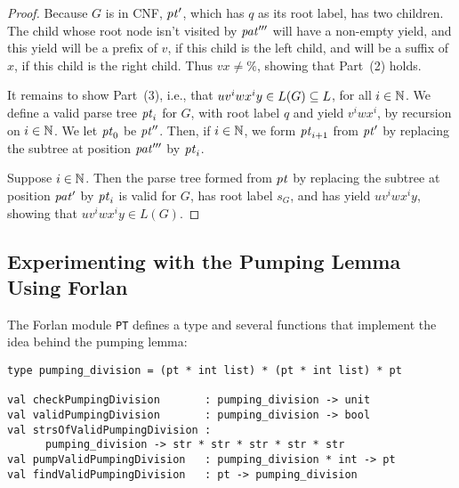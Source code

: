 \begin{proof}
Because $G$ is in CNF, ${\it pt}'$, which has $q$ as its root label, has
two children.  The child whose root node isn't visited by ${\it pat}'''$
will have a non-empty yield, and this yield will be a prefix of $v$,
if this child is the left child, and will be a suffix of $x$, if this
child is the right child.  Thus $vx\neq\%$, showing that Part~(2)
holds.

It remains to show Part~(3), i.e., that $uv^iwx^iy\in L(G)\subseteq L$, for
all $i\in\mathbb{N}$.  We define a valid parse tree ${\it pt}_i$ for $G$, with root
label $q$ and yield $v^iwx^i$, by recursion on $i\in\mathbb{N}$.  We let ${\it pt}_0$ be
${\it pt}''$.  Then, if $i\in\mathbb{N}$, we form ${\it pt}_{i+1}$ from ${\it pt}'$ by
replacing the subtree at position ${\it pat}'''$ by ${\it pt}_i$.

Suppose $i\in\mathbb{N}$.  Then the parse tree formed from ${\it pt}$ by
replacing the subtree at position ${\it pat}'$ by ${\it pt}_i$ is valid for $G$,
has root label $s_G$, and has yield $uv^iwx^iy$, showing that
$uv^iwx^iy\in L(G)$.
\end{proof}

\subsection{Experimenting with the Pumping Lemma Using Forlan}

The Forlan module \texttt{PT} defines a type and several functions
that implement the idea behind the pumping lemma:
\begin{verbatim}
type pumping_division = (pt * int list) * (pt * int list) * pt

val checkPumpingDivision       : pumping_division -> unit
val validPumpingDivision       : pumping_division -> bool
val strsOfValidPumpingDivision :
      pumping_division -> str * str * str * str * str
val pumpValidPumpingDivision   : pumping_division * int -> pt
val findValidPumpingDivision   : pt -> pumping_division
\end{verbatim}

